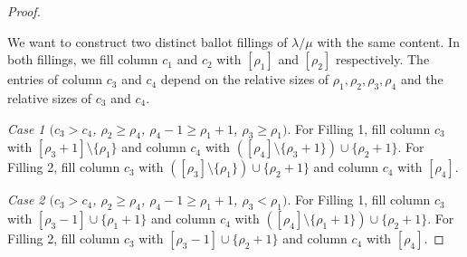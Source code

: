 \documentclass[10pt]{article}
\theoremstyle{definition}
\let\hypertargeta\hypertarget %
\newenvironment{Case}[1]{\par\vskip2pt\noindent%
\emph{#1}.}{\vskip2pt}
\begin{document}
\begin{proof}
\begin{figure}[htb]
\begin{subfigure}{0.24\textwidth}
 \caption{}
 \end{subfigure}
 \begin{subfigure}{0.24\textwidth}
 \hspace{0.75cm}
 \caption{}
		\label{Figure2d}
 \end{subfigure}
 \caption{}
 \label{only4col} 
\end{figure}

We want to construct two distinct ballot fillings of $\lambda/\mu$ with the same content. In both fillings, we fill column $c_1$ and $c_2$ with $[\rho_1]$ and $[\rho_2]$ respectively. The entries of column $c_3$ and $c_4$ depend on the relative sizes of $\rho_1,\rho_2,\rho_3,\rho_4$ and the relative sizes of $c_3$ and $c_4$.


\begin{Case}
{\hypertargeta{prop3.7case_1}{Case 1} $(c_3 > c_4$, $\rho_2\geq \rho_4$, $\rho_4-1\geq \rho_1+1$, $\rho_3\geq \rho_1)$} 
For Filling 1, fill column $c_3$ with $[\rho_3+1]\setminus \{\rho_1\}$ and column $c_4$ with $([\rho_4]\setminus\{\rho_3+1\})\cup\{\rho_2+1\}$.
For Filling 2, fill column $c_3$ with $([\rho_3]\setminus \{\rho_1\})\cup \{\rho_2+1\}$ and column $c_4$ with $[\rho_4]$.
\end{Case}

\begin{Case}
{\hypertargeta{prop3.7case_2}{Case 2} $(c_3 > c_4$, $\rho_2\geq \rho_4$, $\rho_4-1\geq \rho_1+1$, $\rho_3< \rho_1)$} 
For Filling 1, fill column $c_3$ with $[\rho_3-1]\cup \{\rho_1 + 1\}$ and column $c_4$ with $([\rho_4]\setminus\{\rho_1+1\})\cup\{\rho_2+1\}$.
For Filling 2, fill column $c_3$ with $[\rho_3-1]\cup \{\rho_2+1\}$ and column $c_4$ with $[\rho_4]$.
\end{Case}


\end{proof}
\end{document}
